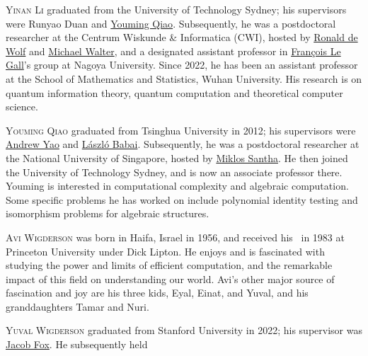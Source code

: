 \documentclass{toc}
\theoremstyle{plain}
\numberwithin{equation}{section}
\theoremstyle{definition}
\begin{document}
%
%
%
%
%
%
%
%
%
%
%
%
%
%
%
%
%
%
%
%
 \begin{tocaboutauthors}
%
%
%
%
%
%
%
%
%
%
%
%
%
%
%
%

\begin{tocabout}[Li]
  \textsc{Yinan Li} graduated from the University of Technology Sydney; his supervisors were Runyao Duan and \href{https://profiles.uts.edu.au/Youming.Qiao}{Youming Qiao}. Subsequently, he was a postdoctoral researcher at the Centrum Wiskunde \& Informatica (CWI), hosted by \href{https://homepages.cwi.nl/~rdewolf/}{Ronald de Wolf} and \href{https://qi.rub.de/walter.html}{Michael Walter}, and a designated assistant professor in \href{http://www.francoislegall.com/}{Fran\c{c}ois Le Gall}'s group at Nagoya University. Since 2022,
%
he has been %
an assistant professor at the School of Mathematics and Statistics, Wuhan University. His research is on quantum information theory, quantum computation and theoretical computer science.
 \end{tocabout}
 \begin{tocabout}[Qiao]
   \textsc{Youming Qiao} graduated from Tsinghua University in 2012; his supervisors were \href{https://iiis.tsinghua.edu.cn/yao/}{Andrew Yao} and \href{https://people.cs.uchicago.edu/~laci/}{L\'aszl\'o Babai}. Subsequently, he was a postdoctoral researcher at the National University of Singapore, hosted by \href{https://www.irif.fr/~santha/}{Miklos Santha}. He then joined the University of Technology Sydney, and is now an associate professor there. Youming is interested in computational complexity and algebraic computation. Some specific problems he has worked on include polynomial identity testing and isomorphism problems
%
for  %
algebraic structures.
 \end{tocabout}
 \begin{tocabout}[WigdersonA]  %
 	\textsc{Avi Wigderson} was born in Haifa, Israel in 1956, and received his \phd\ in 1983 at Princeton University under Dick Lipton. He enjoys and is fascinated with studying the power and limits of efficient computation, and the remarkable impact of this field on understanding our world. Avi's other major source of fascination and joy are his three kids, Eyal, Einat, and Yuval, and his granddaughters Tamar and Nuri.
 \end{tocabout}
 \begin{tocabout}[WigdersonY]  %
   \textsc{Yuval Wigderson} graduated from Stanford University in 2022; his supervisor was \href{https://stanford.edu/~jacobfox/}{Jacob Fox}. He subsequently
%
held  %

\end{tocabout}
\end{tocaboutauthors}
\end{document}
